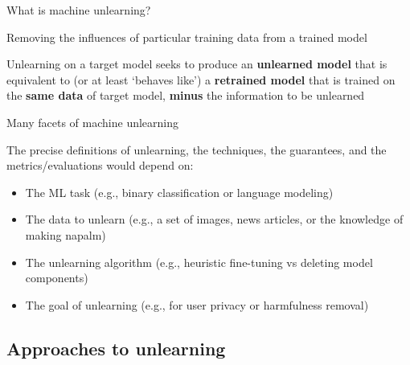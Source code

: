 \documentclass[12pt,aspectratio=169,handout]{beamer}
\begin{document}
\begin{frame}{What is machine unlearning?}

Removing the influences of particular training data from a trained model

Unlearning on a target model seeks to produce an \textbf{unlearned model} that is equivalent to (or at least `behaves like') a \textbf{retrained model} that is trained on the \textbf{same data} of target model, \textbf{minus} the information to be unlearned


\end{frame}

\begin{frame}{Many facets of machine unlearning}

The precise definitions of unlearning, the techniques, the guarantees, and the metrics/evaluations would depend on:

\begin{itemize}
\item The ML task (e.g., binary classification or language modeling)
\item The data to unlearn (e.g., a set of images, news articles, or the knowledge of making napalm)
\item The unlearning algorithm (e.g., heuristic fine-tuning vs deleting model components)
\item The goal of unlearning (e.g., for user privacy or harmfulness removal)
\end{itemize}


\end{frame}


\subsection{Approaches to unlearning}
\end{document}
